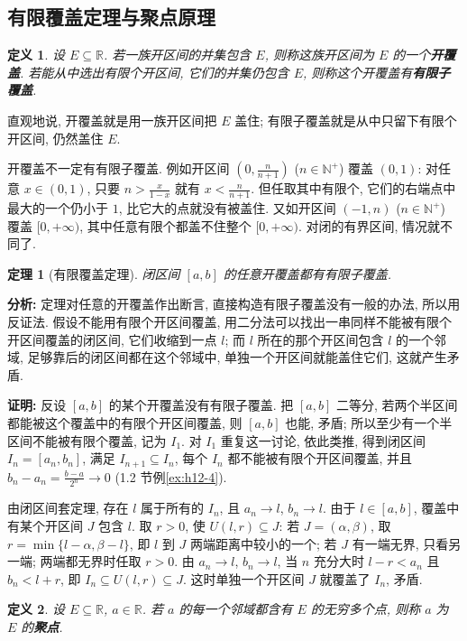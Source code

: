\documentclass[UTF8,openany]{ctexbook}
\theoremstyle{chinesetextbook}
\newtheorem{definition}{定义}[section]
\newtheorem{theorem}{定理}[section]
\newenvironment{cnproof}{\par\indent\textbf{证明:} \ignorespaces}{\par}
\begin{document}
\subsection{有限覆盖定理与聚点原理}
\begin{definition}
设 $E\subseteq\mathbb R$. 若一族开区间的并集包含 $E$, 则称这族开区间为 $E$ 的一个\textbf{开覆盖}. 若能从中选出有限个开区间, 它们的并集仍包含 $E$, 则称这个开覆盖有\textbf{有限子覆盖}.
\end{definition}
直观地说, 开覆盖就是用一族开区间把 $E$ 盖住; 有限子覆盖就是从中只留下有限个开区间, 仍然盖住 $E$.

开覆盖不一定有有限子覆盖. 例如开区间 $\displaystyle\left(0,\frac n{n+1}\right)$ ($n\in\mathbb N^+$) 覆盖 $(0,1)$: 对任意 $x\in(0,1)$, 只要 $\displaystyle n>\frac x{1-x}$ 就有 $\displaystyle x<\frac n{n+1}$. 但任取其中有限个, 它们的右端点中最大的一个仍小于 $1$, 比它大的点就没有被盖住. 又如开区间 $(-1,n)$ ($n\in\mathbb N^+$) 覆盖 $[0,+\infty)$, 其中任意有限个都盖不住整个 $[0,+\infty)$. 对闭的有界区间, 情况就不同了.
\begin{theorem}[有限覆盖定理]
闭区间 $[a,b]$ 的任意开覆盖都有有限子覆盖.
\end{theorem}
\par\indent\textbf{分析:} 定理对任意的开覆盖作出断言, 直接构造有限子覆盖没有一般的办法, 所以用反证法. 假设不能用有限个开区间覆盖, 用二分法可以找出一串同样不能被有限个开区间覆盖的闭区间, 它们收缩到一点 $l$; 而 $l$ 所在的那个开区间包含 $l$ 的一个邻域, 足够靠后的闭区间都在这个邻域中, 单独一个开区间就能盖住它们, 这就产生矛盾.
\begin{cnproof}
反设 $[a,b]$ 的某个开覆盖没有有限子覆盖. 把 $[a,b]$ 二等分, 若两个半区间都能被这个覆盖中的有限个开区间覆盖, 则 $[a,b]$ 也能, 矛盾; 所以至少有一个半区间不能被有限个覆盖, 记为 $I_1$. 对 $I_1$ 重复这一讨论, 依此类推, 得到闭区间 $I_n=[a_n,b_n]$, 满足 $I_{n+1}\subseteq I_n$, 每个 $I_n$ 都不能被有限个开区间覆盖, 并且 $\displaystyle b_n-a_n=\frac{b-a}{2^n}\to0$ (1.2 节例\ref{ex:h12-4}).

由闭区间套定理, 存在 $l$ 属于所有的 $I_n$, 且 $a_n\to l$, $b_n\to l$. 由于 $l\in[a,b]$, 覆盖中有某个开区间 $J$ 包含 $l$. 取 $r>0$, 使 $U(l,r)\subseteq J$: 若 $J=(\alpha,\beta)$, 取 $r=\min\{l-\alpha,\beta-l\}$, 即 $l$ 到 $J$ 两端距离中较小的一个; 若 $J$ 有一端无界, 只看另一端; 两端都无界时任取 $r>0$. 由 $a_n\to l$, $b_n\to l$, 当 $n$ 充分大时 $l-r<a_n$ 且 $b_n<l+r$, 即 $I_n\subseteq U(l,r)\subseteq J$. 这时单独一个开区间 $J$ 就覆盖了 $I_n$, 矛盾.
\end{cnproof}
\begin{definition}
设 $E\subseteq\mathbb R$, $a\in\mathbb R$. 若 $a$ 的每一个邻域都含有 $E$ 的无穷多个点, 则称 $a$ 为 $E$ 的\textbf{聚点}.
\end{definition}
\end{document}
